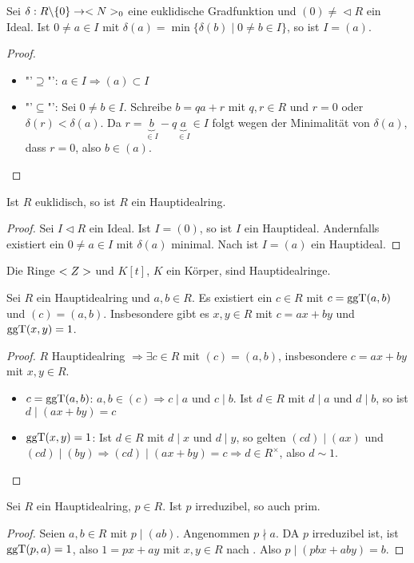 \begin{lemma}
	Sei $\delta:R\backslash \{0\}\to <N>_0$ eine euklidische Gradfunktion und $(0)\neq\vartriangleleft R$ ein Ideal. Ist $0\neq a\in I$ mit $\delta(a)=\min\{\delta(b)\mid 0\neq b\in I\}$, so ist $I=(a)$.
\end{lemma}
\begin{proof}
	\begin{itemize}
		\item "'$\supseteq$"': $a\in I\Rightarrow (a)\subset I$
		\item "'$\subseteq$"': Sei $0\neq b\in I$. Schreibe $b=qa+r$ mit $q,r\in R$ und $r=0$ oder $\delta(r)<\delta(a)$. Da $r=\underbrace{b}_{\in I}-q\underbrace{a}_{\in I}\in I$ folgt wegen der Minimalität von $\delta(a)$, dass $r=0$, also $b\in (a)$.
	\end{itemize}
\end{proof}

\begin{proposition}
	Ist $R$ euklidisch, so ist $R$ ein Hauptidealring.
\end{proposition}
\begin{proof}
	Sei $I\vartriangleleft R$ ein Ideal. Ist $I=(0)$, so ist $I$ ein Hauptideal. Andernfalls existiert ein $0\neq a\in I$ mit $\delta(a)$ minimal. Nach  ist $I=(a)$ ein Hauptideal.
\end{proof}

\begin{conclusion}
	Die Ringe $<Z>$ und $K[t]$, $K$ ein Körper, sind Hauptidealringe.
\end{conclusion}

\begin{lemma}
	Sei $R$ ein Hauptidealring und $a,b\in R$. Es existiert ein $c\in R$ mit $c=\operatorname{ggT}(a,b)$ und $(c)=(a,b)$. Insbesondere gibt es $x,y\in R$ mit $c=ax+by$ und $\operatorname{ggT}(x,y)=1$.
\end{lemma}
\begin{proof}
	$R$ Hauptidealring $\Rightarrow\exists c\in R$ mit $(c)=(a,b)$, insbesondere $c=ax+by$ mit $x,y\in R$.
	\begin{itemize}
		\item $c=\operatorname{ggT}(a,b)$: $a,b\in (c)\Rightarrow c\mid a$ und $c\mid b$. Ist $d\in R$ mit $d\mid a$ und $d\mid b$, so ist $d\mid (ax+by)=c$
		\item $\operatorname{ggT}(x,y)=1$: Ist $d\in R$ mit $d\mid x$ und $d\mid y$, so gelten $(cd)\mid (ax)$ und $(cd)\mid (by)\Rightarrow (cd)\mid (ax+by)=c\Rightarrow d\in R^\times$, also $d\sim 1$.
	\end{itemize}
\end{proof}

\begin{proposition}
	Sei $R$ ein Hauptidealring, $p\in R$. Ist $p$ irreduzibel, so auch prim.
\end{proposition}
\begin{proof}
	Seien $a,b\in R$ mit $p\mid (ab)$. Angenommen $p\nmid a$. DA $p$ irreduzibel ist, ist $\operatorname{ggT}(p,a)=1$, also $1=px+ay$ mit $x,y\in R$ nach . Also $p\mid (pbx+aby)=b$.
\end{proof}